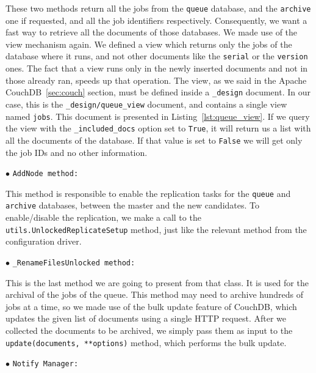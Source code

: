 \begin{description}
    These two methods return all the jobs from the \texttt{queue} database, and
    the \texttt{archive} one if requested, and all the job identifiers
    respectively. Consequently, we want a fast way to retrieve all the documents
    of those databases. We made use of the view mechanism again. We
    defined a view which returns only the jobs of the database where it runs,
    and not other documents like the \texttt{serial} or the \texttt{version}
    ones. The fact that a view runs only in the newly inserted documents and not
    in those already ran, speeds up that operation. The view, as we said in the
    Apache CouchDB~\ref{sec:couch} section, must be defined inside a
    \texttt{\_design} document. In our case, this is the
    \texttt{\_design/queue\_view} document, and contains a single view named
    \texttt{jobs}. This document is presented in Listing~\ref{lst:queue_view}.
    If we query the view with the \texttt{\_included\_docs} option set to
    \texttt{True}, it will return us a list with all the documents of the
    database. If that value is set to \texttt{False} we will get only the job IDs
    and no other information.


    \bigskip
    $\bullet$ {\Large{\texttt{AddNode method:}}}

    This method is responsible to enable the replication tasks for the
    \texttt{queue} and \texttt{archive} databases, between the master and the
    new candidates. To enable/disable the replication, we make a call to the
    \texttt{utils.UnlockedReplicateSetup} method, just like the relevant method
    from the configuration driver.

    \bigskip
    $\bullet$ {\Large{\texttt{\_RenameFilesUnlocked method:}}}

    This is the last method we are going to present from that class. It is used
    for the archival of the jobs of the queue. This method may need to archive
    hundreds of jobs at a time, so we made use of the bulk update feature of
    CouchDB, which updates the given list of documents using a single HTTP
    request. After we collected the documents to be archived, we simply pass
    them as input to the \texttt{update(documents, **options)} method, which
    performs the bulk update.

    \bigskip
    $\bullet$ {\Large{\texttt{Notify Manager:}}}


\end{description}
